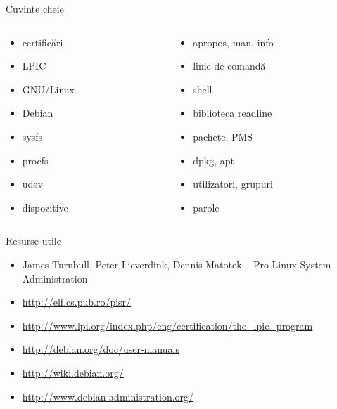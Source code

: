 \documentclass{training}
\begin{document}
\begin{frame}{Cuvinte cheie}
  \begin{columns}
    \begin{column}{0.5\textwidth}
      \begin{itemize}
        \item certificări
        \item LPIC
        \item GNU/Linux
        \item Debian
        \item sysfs
        \item procfs
        \item udev
        \item dispozitive
      \end{itemize}
    \end{column}
    \begin{column}{0.5\textwidth}
      \begin{itemize}
        \item apropos, man, info
        \item linie de comandă
        \item shell
        \item biblioteca readline
        \item pachete, PMS
        \item dpkg, apt
        \item utilizatori, grupuri
        \item parole
      \end{itemize}
    \end{column}
  \end{columns}
\end{frame}

\begin{frame}{Resurse utile}
  \begin{itemize}
    \item James Turnbull, Peter Lieverdink, Dennis Matotek -- Pro Linux System Administration
    \item \url{http://elf.cs.pub.ro/pisr/}
    \item \url{http://www.lpi.org/index.php/eng/certification/the_lpic_program}
    \item \url{http://debian.org/doc/user-manuals}
    \item \url{http://wiki.debian.org/}
    \item \url{http://www.debian-administration.org/}
  \end{itemize}
\end{frame}
\end{document}
